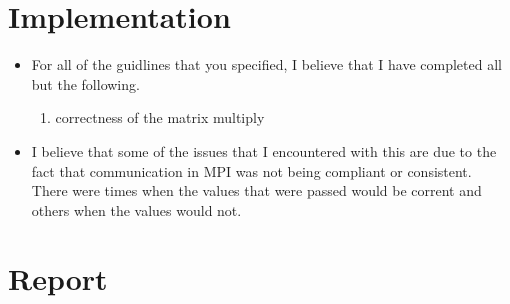 \documentclass[12pt, letterpaper]{article}
\begin{document}
\section{Implementation}
\begin{itemize}
  \item For all of the guidlines that you specified, I believe that I have completed all but the following.
  \begin{enumerate}
    \item correctness of the matrix multiply
  \end{enumerate}
  \item I believe that some of the issues that I encountered with this are due to the fact that communication in MPI was not being compliant or consistent. There were times when the values that were passed would be corrent and others when the values would not.
\end{itemize}



\section{Report}
\end{document}

